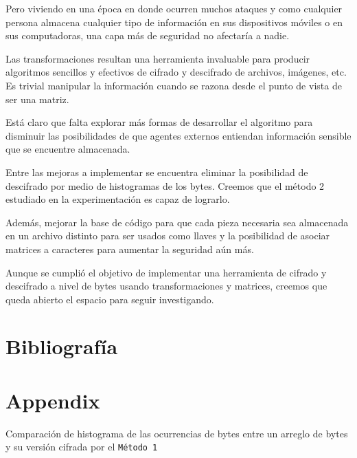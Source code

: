 \documentclass[a4paper]{article}
\begin{document}
Pero viviendo en una época en donde ocurren muchos ataques y como cualquier
persona almacena cualquier tipo de información en sus dispositivos móviles o en
sus computadoras, una capa más de seguridad no afectaría a nadie.

Las transformaciones resultan una herramienta invaluable para producir
algoritmos sencillos y efectivos de cifrado y descifrado de archivos, imágenes,
etc. Es trivial manipular la información cuando se razona desde el punto de
vista de ser una matriz.

Está claro que falta explorar más formas de desarrollar el algoritmo para
disminuir las posibilidades de que agentes externos entiendan información
sensible que se encuentre almacenada.

Entre las mejoras a implementar se encuentra eliminar la posibilidad de
descifrado por medio de histogramas de los bytes. Creemos que el método 2
estudiado en la experimentación es capaz de lograrlo.

Además, mejorar la base de código para que cada pieza necesaria sea almacenada
en un archivo distinto para ser usados como llaves y la posibilidad de asociar
matrices a caracteres para aumentar la seguridad aún más.

Aunque se cumplió el objetivo de implementar una herramienta de cifrado y
descifrado
a
nivel de bytes usando transformaciones y matrices, creemos que queda abierto el
espacio para seguir investigando.



\newpage
\section{Bibliografía}
\printbibliography[heading=none]

\newpage

\appendix

\section{Appendix}

Comparación de histograma de las ocurrencias de bytes entre un arreglo de bytes
y su versión cifrada por el \texttt{Método 1}
\end{document}
